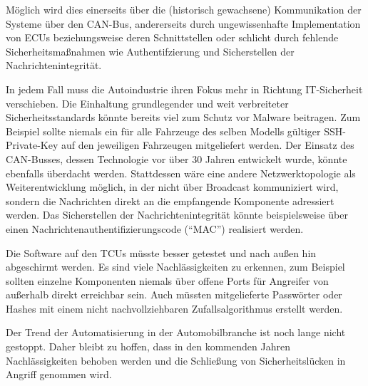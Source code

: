 \documentclass[
    fontsize=12pt,
    headings=small,
    parskip=half,           %
    bibliography=totoc,
    numbers=noenddot,       %
    open=any,               %
    ]{scrreprt}
\begin{document}
Möglich wird dies einerseits über die (historisch gewachsene) Kommunikation der Systeme über den CAN-Bus, andererseits durch ungewissenhafte Implementation von ECUs beziehungsweise deren Schnittstellen oder schlicht durch fehlende Sicherheitsmaßnahmen wie Authentifzierung und Sicherstellen der Nachrichtenintegrität.

In jedem Fall muss die Autoindustrie ihren Fokus mehr in Richtung IT-Sicherheit verschieben. Die Einhaltung grundlegender und weit verbreiteter Sicherheitsstandards könnte bereits viel zum Schutz vor Malware beitragen. Zum Beispiel sollte niemals ein für alle Fahrzeuge des selben Modells gültiger SSH-Private-Key auf den jeweiligen Fahrzeugen mitgeliefert werden. Der Einsatz des CAN-Busses, dessen Technologie vor über 30 Jahren entwickelt wurde, könnte ebenfalls überdacht werden. Stattdessen wäre eine andere Netzwerktopologie als Weiterentwicklung möglich, in der nicht über Broadcast kommuniziert wird, sondern die Nachrichten direkt an die empfangende Komponente adressiert werden. Das Sicherstellen der Nachrichtenintegrität könnte beispielsweise über einen Nachrichtenauthentifizierungscode ("`MAC"') realisiert werden.

Die Software auf den TCUs müsste besser getestet und nach außen hin abgeschirmt werden. Es sind viele Nachlässigkeiten zu erkennen, zum Beispiel sollten einzelne Komponenten niemals über offene Ports für Angreifer von außerhalb direkt erreichbar sein. Auch müssten mitgelieferte Passwörter oder Hashes mit einem nicht nachvollziehbaren Zufallsalgorithmus erstellt werden.

Der Trend der Automatisierung in der Automobilbranche ist noch lange nicht gestoppt. Daher bleibt zu hoffen, dass in den kommenden Jahren Nachlässigkeiten behoben werden und die Schließung von Sicherheitslücken in Angriff genommen wird.


\nocite{*}


\end{document}
